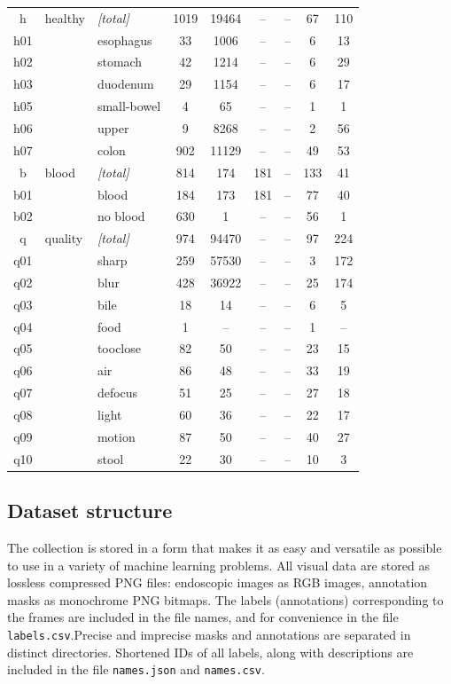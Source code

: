\documentclass[preprint]{article}
\renewcommand{\twocolumn}{}
\begin{document}
\begin{longtable}{c|l|l|c|c|c|c|c|c}
\hline
h & healthy & \textit{[total]} & 1019 & 19464 & -- & -- & 67 & 110 \\ 
h01 &  & esophagus & 33 & 1006 & -- & -- & 6 & 13 \\ 
h02 &  & stomach & 42 & 1214 & -- & -- & 6 & 29 \\ 
h03 &  & duodenum & 29 & 1154 & -- & -- & 6 & 17 \\ 
h05 &  & small-bowel & 4 & 65 & -- & -- & 1 & 1 \\ 
h06 &  & upper & 9 & 8268 & -- & -- & 2 & 56 \\ 
h07 &  & colon & 902 & 11129 & -- & -- & 49 & 53 \\ 

\hline
b & blood & \textit{[total]} & 814 & 174 & 181 & -- & 133 & 41 \\ 
b01 &  & blood & 184 & 173 & 181 & -- & 77 & 40 \\ 
b02 &  & no blood & 630 & 1 & -- & -- & 56 & 1 \\ 

\hline
q & quality & \textit{[total]} & 974 & 94470 & -- & -- & 97 & 224 \\ 
q01 &  & sharp & 259 & 57530 & -- & -- & 3 & 172 \\ 
q02 &  & blur & 428 & 36922 & -- & -- & 25 & 174 \\ 
q03 &  & bile & 18 & 14 & -- & -- & 6 & 5 \\ 
q04 &  & food & 1 & -- & -- & -- & 1 & -- \\ 
q05 &  & tooclose & 82 & 50 & -- & -- & 23 & 15 \\ 
q06 &  & air & 86 & 48 & -- & -- & 33 & 19 \\ 
q07 &  & defocus & 51 & 25 & -- & -- & 27 & 18 \\ 
q08 &  & light & 60 & 36 & -- & -- & 22 & 17 \\ 
q09 &  & motion & 87 & 50 & -- & -- & 40 & 27 \\ 
q10 &  & stool & 22 & 30 & -- & -- & 10 & 3 \\ 


\end{longtable}
\normalsize
\twocolumn


\subsection{Dataset structure}


The collection is stored in a form that makes it as easy and versatile as possible to use in a variety of machine learning problems. All visual data are stored as lossless compressed PNG files: endoscopic images as RGB images, annotation masks as monochrome PNG bitmaps. The labels (annotations) corresponding to the frames are included in the file names, and for convenience in the file \texttt{labels.csv}.Precise and imprecise masks and annotations are separated in distinct directories.  Shortened IDs of all labels, along with descriptions are included in the file \texttt{names.json} and \texttt{names.csv}.
\end{document}
